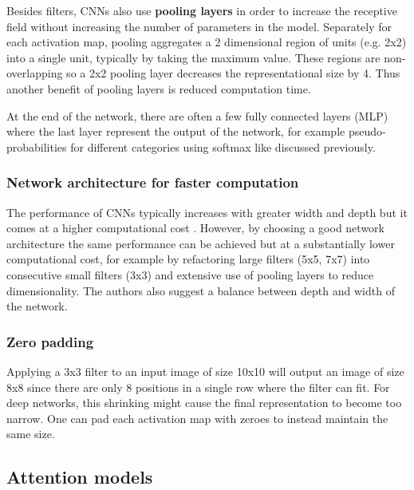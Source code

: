 Besides filters, CNNs also use \textbf{pooling layers} in order to increase the receptive field without increasing the number of parameters in the model.
Separately for each activation map, pooling aggregates a 2 dimensional region of units (e.g. 2x2) into a single unit, typically by taking the maximum value. These regions are non-overlapping so a 2x2 pooling layer decreases the representational size by 4. Thus another benefit of pooling layers is reduced computation time.

At the end of the network, there are often a few fully connected layers (MLP) where the last layer represent the output of the network, for example pseudo-probabilities for different categories using softmax like discussed previously.

\subsubsection{Network architecture for faster computation}

The performance of CNNs typically increases with greater width and depth but it comes at a higher computational cost \cite{InceptionV3}. However, by choosing a good network architecture the same performance can be achieved but at a substantially lower computational cost, for example by refactoring large filters (5x5, 7x7) into consecutive small filters (3x3) and extensive use of pooling layers to reduce dimensionality. The authors also suggest a balance between depth and width of the network.

\subsubsection{Zero padding}

Applying a 3x3 filter to an input image of size 10x10 will output an image of size 8x8 since there are only 8 positions in a single row where the filter can fit. For deep networks, this shrinking might cause the final representation to become too narrow.
One can pad each activation map with zeroes to instead maintain the same size.

\subsection{Attention models}


